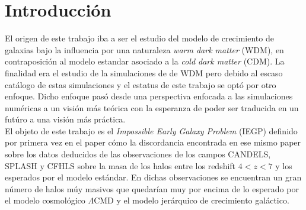 
\chapter{Introducción} %

\label{introduction} %


\newcommand{\keyword}[1]{\textbf{#1}}
\newcommand{\tabhead}[1]{\textbf{#1}}
\newcommand{\code}[1]{\texttt{#1}}
\newcommand{\file}[1]{\texttt{\bfseries#1}}
\newcommand{\option}[1]{\texttt{\itshape#1}}



El origen de este trabajo iba a ser el estudio del modelo de crecimiento de galaxias bajo la influencia por una naturaleza \textit{warm dark matter} (WDM), en contraposición al modelo estandar asociado a la \textit{cold dark matter} (CDM). La finalidad era el estudio de la simulaciones de de WDM pero debido al escaso cat\'alogo de estas simulaciones y el estatus de este trabajo se opt\'o por otro enfoque. Dicho enfoque pas\'o desde una perspectiva enfocada a las simulaciones num\'ericas a un visi\'on m\'as te\'orica con la esperanza de poder ser traducida en un fut\'uro a una visi\'on m\'as pr\'actica.\\

El objeto de este trabajo es el \textit{Impossible Early Galaxy Problem} (IEGP) definido por primera vez en el paper \cite{steinhardt2016impossibly} c\'omo la discordancia encontrada en ese mismo paper sobre los datos deducidos de las observaciones de los campos CANDELS, SPLASH y CFHLS sobre la masa de los halos entre los redshift $4<z<7$ y los esperados por el modelo est\'andar. En dichas observaciones se encuentran un gran n\'umero de halos m\'uy masivos que quedar\'ian muy por encima de lo esperado por el modelo cosmol\'ogico $\Lambda$CMD y el modelo jer\'arquico de crecimiento gal\'actico.

